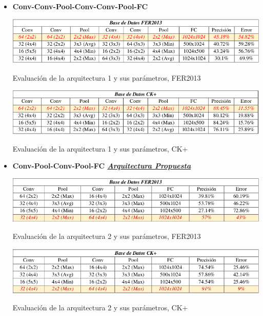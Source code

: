 \begin{itemize}
\item {\textbf{Conv-Conv-Pool-Conv-Conv-Pool-FC}

\begin{table}[H]
    \centering
    \includegraphics[width=140mm]{Imagenes/tabla_arqui_1_fer.png} 
    \caption{Evaluación de la arquitectura 1 y sus parámetros, FER2013}
    \label{tab:tabla_arqui_1_fer}
\end{table}

\begin{table}[H]
    \centering
    \includegraphics[width=140mm]{Imagenes/tabla_arqui_1_CK.png}
    \caption{Evaluación de la arquitectura 1 y sus parámetros, CK+}
    \label{tab:tabla_arqui_1_CK}
\end{table}

}

\item {\textbf{Conv-Pool-Conv-Pool-FC \underline{\textit{Arquitectura Propuesta}} }

\begin{table}[H]
    \centering
    \includegraphics[width=140mm]{Imagenes/tabla_arqui_2_fer.png} 
    \caption{Evaluación de la arquitectura 2 y sus parámetros, FER2013}
    \label{tab:tabla_arqui_2_fer}
\end{table}

\begin{table}[H]
    \centering
    \includegraphics[width=140mm]{Imagenes/tabla_arqui_2_CK.png}
    \caption{Evaluación de la arquitectura 2 y sus parámetros, CK+}
    \label{tab:tabla_arqui_2_CK}
\end{table}

}
\end{itemize}
